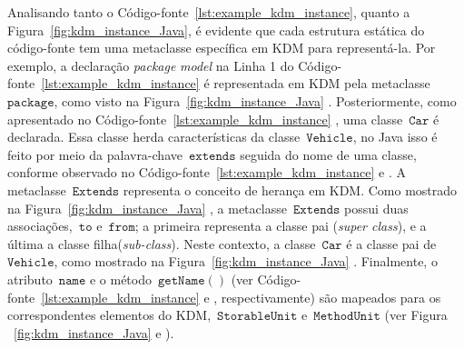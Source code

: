 Analisando tanto o Código-fonte~\ref{lst:example_kdm_instance}, quanto a Figura~\ref{fig:kdm_instance_Java}, é evidente que cada estrutura estática do código-fonte tem uma metaclasse específica em KDM para representá-la. Por exemplo, a declaração \textit{package} \textit{model} na Linha 1 do Código-fonte~\ref{lst:example_kdm_instance}  é representada em KDM pela metaclasse ~$\mathtt{package}$, como visto na Figura~\ref{fig:kdm_instance_Java} . Posteriormente, como apresentado no Código-fonte~\ref{lst:example_kdm_instance} , uma classe~$\mathtt{Car}$ é declarada. Essa classe herda características da classe~$\mathtt{Vehicle}$, no Java isso é feito por meio da palavra-chave~$\mathtt{extends}$ seguida do nome de uma classe, conforme observado no Código-fonte~\ref{lst:example_kdm_instance}  e . A metaclasse~$\mathtt{Extends}$ representa o conceito de herança em KDM. Como mostrado na Figura~\ref{fig:kdm_instance_Java} , a metaclasse~$\mathtt{Extends}$ possui duas associações,~$\mathtt{to}$ e~$\mathtt{from}$; a primeira representa a classe pai (\textit{super class}), e a última a classe filha(\textit{sub-class}). Neste contexto, a classe~$\mathtt{Car}$ é a classe pai de~$\mathtt{Vehicle}$, como mostrado na Figura~\ref{fig:kdm_instance_Java} . Finalmente, o atributo~$\mathtt{name}$ e o método~$\mathtt{getName()}$ (ver Código-fonte~\ref{lst:example_kdm_instance}  e , respectivamente) são mapeados para os correspondentes elementos do KDM,~$\mathtt{StorableUnit}$ e~$\mathtt{MethodUnit}$ (ver Figura ~\ref{fig:kdm_instance_Java}  e ). 
%
